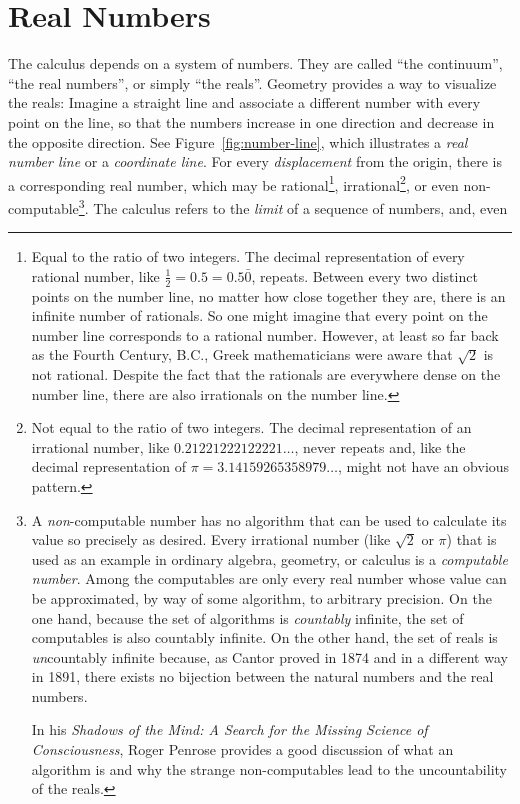 
\chapter{Real Numbers}

The calculus depends on a system of numbers.  They are called ``the
continuum'', ``the real numbers'', or simply ``the reals''.  Geometry provides
a way to visualize the reals: Imagine a straight line and associate a different
number with every point on the line, so that the numbers increase in one
direction and decrease in the opposite direction. See
Figure~\ref{fig:number-line}, which illustrates a \emph{real number line} or a
\emph{coordinate line}.  For every \emph{displacement} from the origin, there
is a corresponding real number, which may be rational\footnote{%
   Equal to the ratio of two integers. The decimal representation of every
   rational number, like $\frac{1}{2} = 0.5 = 0.5\bar{0}$, repeats. Between
   every two distinct points on the number line, no matter how close together
   they are, there is an infinite number of rationals. So one might imagine
   that every point on the number line corresponds to a rational number.
   However, at least so far back as the Fourth Century, B.C., Greek
   mathematicians were aware that $\sqrt{2}$ is not rational. Despite the fact
   that the rationals are everywhere dense on the number line, there are also
   irrationals on the number line.
},
irrational\footnote{%
   Not equal to the ratio of two integers. The decimal representation of an
   irrational number, like $0.21221222122221\ldots$, never repeats and, like
   the decimal representation of $\pi = 3.14159265358979\ldots$, might not have
   an obvious pattern.%
}, or even non-computable\footnote{%
   A \emph{non}-computable number has no algorithm that can be used to
   calculate its value so precisely as desired.  Every irrational number (like
   $\sqrt{2}$ or $\pi$) that is used as an example in ordinary algebra,
   geometry, or calculus is a \emph{computable number}.  Among the computables
   are only every real number whose value can be approximated, by way of some
   algorithm, to arbitrary precision.  On the one hand, because the set of
   algorithms is \emph{countably} infinite, the set of computables is also
   countably infinite. On the other hand, the set of reals is
   \emph{un}countably infinite because, as Cantor proved in 1874 and in a
   different way in 1891, there exists no bijection between the natural numbers
   and the real numbers.
   
   In his {\it Shadows of the Mind: A Search for the Missing Science of
   Consciousness}, Roger Penrose provides a good discussion of what an
   algorithm is and why the strange non-computables lead to the uncountability
   of the reals.%
}. The calculus refers to the \emph{limit} of a sequence of numbers, and, even
